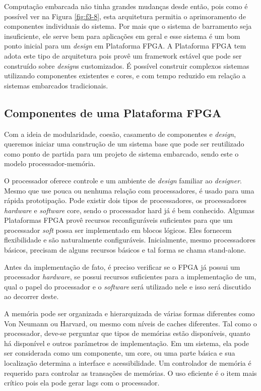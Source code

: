 Computação embarcada não tinha grandes mudanças desde então, pois como é possível ver na Figura \ref{fig:f3-8}, esta arquitetura permitia o aprimoramento de componentes individuais do sistema. Por mais que o sistema de barramento seja insuficiente, ele serve bem para aplicações em geral e esse sistema é um bom ponto inicial para um \textit{design} em Plataforma FPGA. A Plataforma FPGA tem adota este tipo de arquitetura pois provê um framework estável que pode ser construído sobre \textit{design}s customizados. É possível construir complexos sistemas utilizando componentes existentes e cores, e com tempo reduzido em relação a sistemas embarcados tradicionais.





\subsection{Componentes de uma Plataforma FPGA}



Com a ideia de modularidade, coesão, casamento de componentes e \textit{design}, queremos iniciar uma construção de um sistema base que pode ser reutilizado como ponto de partida para um projeto de sistema embarcado, sendo este o modelo processador-memória.

O processador oferece controle e um ambiente de \textit{design} familiar ao \textit{\textit{design}er}. Mesmo que use pouca ou nenhuma relação com processadores, é usado para uma rápida prototipação. Pode existir dois tipos de processadores, os processadores \textit{hardware} e \textit{software} core, sendo o processador hard já é bem conhecido. Algumas Plataformas FPGA provê recursos reconfiguráveis suficientes para que um processador \textit{soft} possa ser implementado em blocos lógicos. Eles fornecem flexibilidade e são naturalmente configuráveis. Inicialmente, mesmo processadores básicos, precisam de alguns recursos básicos e tal forma se chama stand-alone.

Antes da implementação de fato, é preciso verificar se o FPGA já possui um processador \textit{hardware}, se possui recursos suficientes para a implementação de um, qual o papel do processador e o \textit{software} será utilizado nele e isso será discutido ao decorrer deste.

A memória pode ser organizada e hierarquizada de várias formas diferentes como Von Neumann ou Harvard, ou mesmo com níveis de caches diferentes. Tal como o processador, deve-se perguntar que tipos de memórias estão disponíveis, quanto há disponível e outros parâmetros de implementação. Em um sistema, ela pode ser considerada como um componente, um core, ou uma parte básica e sua localização determina a interface e acessibilidade. Um controlador de memória é requerido para controlar as transações de memórias. O uso eficiente é o item mais crítico pois ela pode gerar lags com o processador.





